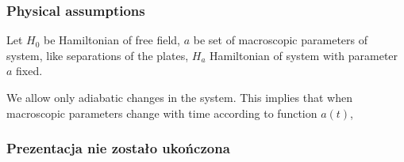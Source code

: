 \documentclass[10pt,t]{beamer}
\begin{document}
\begin{frame}
  \frametitle{Physical assumptions}


  Let $H_{ 0 }$ be Hamiltonian of free field, $a$ be set of
  macroscopic parameters of system, like separations of the plates,
  $H_{ a }$ Hamiltonian of system with parameter $a$ fixed.

  We allow only adiabatic changes in the system. This implies that
  when macroscopic parameters change with time according to function
  $a( t )$,

\end{frame}





\begin{frame}
  \frametitle{Prezentacja nie zostało ukończona}


\end{frame}










\appendix















% 







\end{document}
